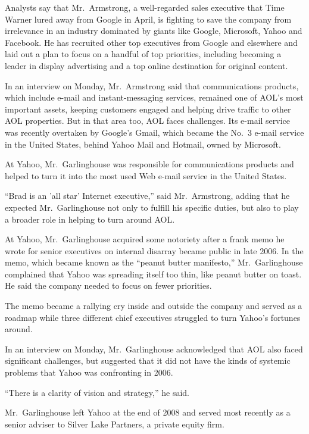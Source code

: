 ﻿\documentclass[12pt]{article}
\begin{document}
Analysts say that Mr.~Armstrong, a well-regarded sales executive that Time Warner lured away from
Google in April, is fighting to save the company from irrelevance in an industry dominated by giants
like Google, Microsoft, Yahoo and Facebook. He has recruited other top executives from Google and
elsewhere and laid out a plan to focus on a handful of top priorities, including becoming a leader
in display advertising and a top online destination for original content.

In an interview on Monday, Mr.~Armstrong said that communications products, which include e-mail and
instant-messaging services, remained one of AOL's most important assets, keeping customers engaged
and helping drive traffic to other AOL properties. But in that area too, AOL faces challenges. Its
e-mail service was recently overtaken by Google's Gmail, which became the No.~3 e-mail service in
the United States, behind Yahoo Mail and Hotmail, owned by Microsoft.

At Yahoo, Mr.~Garlinghouse was responsible for communications products and helped to turn it into
the most used Web e-mail service in the United States.

``Brad is an 'all star' Internet executive,'' said Mr.~Armstrong, adding that he expected
Mr.~Garlinghouse not only to fulfill his specific duties, but also to play a broader role in helping
to turn around AOL.

At Yahoo, Mr.~Garlinghouse acquired some notoriety after a frank memo he wrote for senior executives
on internal disarray became public in late 2006. In the memo, which became known as the ``peanut
butter manifesto,'' Mr.~Garlinghouse complained that Yahoo was spreading itself too thin, like
peanut butter on toast. He said the company needed to focus on fewer priorities.

The memo became a rallying cry inside and outside the company and served as a roadmap while three
different chief executives struggled to turn Yahoo's fortunes around.

In an interview on Monday, Mr.~Garlinghouse acknowledged that AOL also faced significant challenges,
but suggested that it did not have the kinds of systemic problems that Yahoo was confronting in
2006.

``There is a clarity of vision and strategy,'' he said.

Mr.~Garlinghouse left Yahoo at the end of 2008 and served most recently as a senior adviser to
Silver Lake Partners, a private equity firm.
\end{document}
